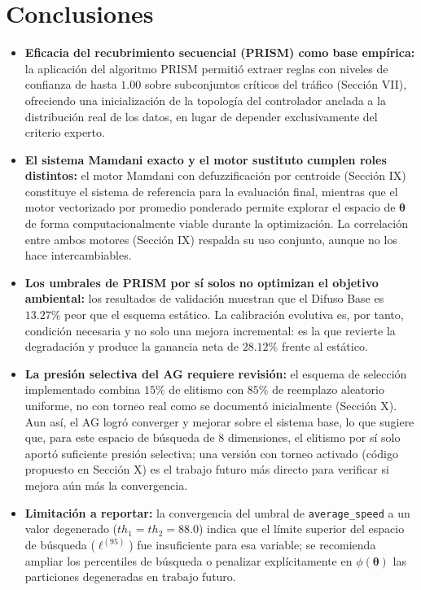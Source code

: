 \documentclass[12pt,a4paper]{article}
\begin{document}
\section{Conclusiones}

\begin{itemize}
 \item \textbf{Eficacia del recubrimiento secuencial (PRISM) como
 base empírica:} la aplicación del algoritmo PRISM permitió extraer
 reglas con niveles de confianza de hasta $1.00$ sobre subconjuntos
 críticos del tráfico (Sección VII), ofreciendo una inicialización
 de la topología del controlador anclada a la distribución real de
 los datos, en lugar de depender exclusivamente del criterio experto.

 \item \textbf{El sistema Mamdani exacto y el motor sustituto
 cumplen roles distintos:} el motor Mamdani con defuzzificación por
 centroide (Sección IX) constituye el sistema de referencia para
 la evaluación final, mientras que el motor vectorizado por
 promedio ponderado permite explorar el espacio de
 $\boldsymbol{\theta}$ de forma computacionalmente viable durante la
 optimización. La correlación entre ambos motores (Sección IX)
 respalda su uso conjunto, aunque no los hace intercambiables.

 \item \textbf{Los umbrales de PRISM por sí solos no optimizan el
 objetivo ambiental:} los resultados de validación muestran que el
 Difuso Base es $13.27\%$ peor que el esquema estático. La
 calibración evolutiva es, por tanto, condición necesaria y no
 solo una mejora incremental: es la que revierte la degradación y
 produce la ganancia neta de $28.12\%$ frente al estático.

 \item \textbf{La presión selectiva del AG requiere revisión:} el
 esquema de selección implementado combina $15\%$ de elitismo con
 $85\%$ de reemplazo aleatorio uniforme, no con torneo real como se
 documentó inicialmente (Sección X). Aun así, el AG logró converger
 y mejorar sobre el sistema base, lo que sugiere que, para este
 espacio de búsqueda de 8 dimensiones, el elitismo por sí solo
 aportó suficiente presión selectiva; una versión con torneo
 activado (código propuesto en Sección X) es el trabajo futuro más
 directo para verificar si mejora aún más la convergencia.

 \item \textbf{Limitación a reportar:} la convergencia del umbral de
 \texttt{average\_speed} a un valor degenerado ($th_1=th_2=88.0$)
 indica que el límite superior del espacio de búsqueda
 ($\ell^{(95)}$) fue insuficiente para esa variable; se recomienda
 ampliar los percentiles de búsqueda o penalizar explícitamente en
 $\phi(\boldsymbol{\theta})$ las particiones degeneradas en trabajo
 futuro.
\end{itemize}
\end{document}
